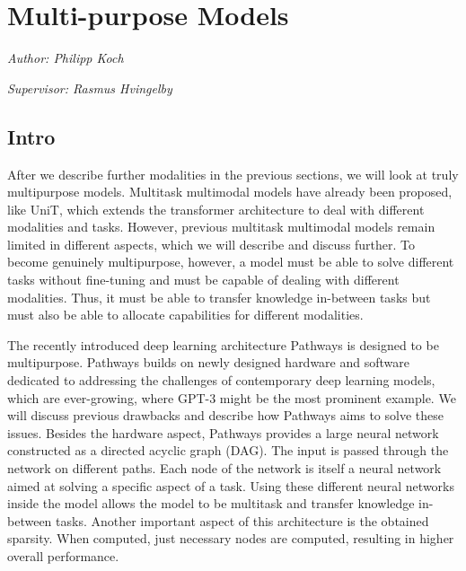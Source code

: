 \documentclass[
]{krantz}
\begin{document}
\hypertarget{multi-purpose-models}{%
\chapter{Multi-purpose Models}\label{multi-purpose-models}}

\emph{Author: Philipp Koch}

\emph{Supervisor: Rasmus Hvingelby}

\hypertarget{intro-2}{%
\section{Intro}\label{intro-2}}

After we describe further modalities in the previous sections, we will look at truly multipurpose models. Multitask multimodal models have already been proposed, like UniT, which extends the transformer architecture to deal with different modalities and tasks. However, previous multitask multimodal models remain limited in different aspects, which we will describe and discuss further. To become genuinely multipurpose, however, a model must be able to solve different tasks without fine-tuning and must be capable of dealing with different modalities. Thus, it must be able to transfer knowledge in-between tasks but must also be able to allocate capabilities for different modalities.

The recently introduced deep learning architecture Pathways is designed to be multipurpose. Pathways builds on newly designed hardware and software dedicated to addressing the challenges of contemporary deep learning models, which are ever-growing, where GPT-3 might be the most prominent example. We will discuss previous drawbacks and describe how Pathways aims to solve these issues. Besides the hardware aspect, Pathways provides a large neural network constructed as a directed acyclic graph (DAG). The input is passed through the network on different paths. Each node of the network is itself a neural network aimed at solving a specific aspect of a task. Using these different neural networks inside the model allows the model to be multitask and transfer knowledge in-between tasks. Another important aspect of this architecture is the obtained sparsity. When computed, just necessary nodes are computed, resulting in higher overall performance.
\end{document}
